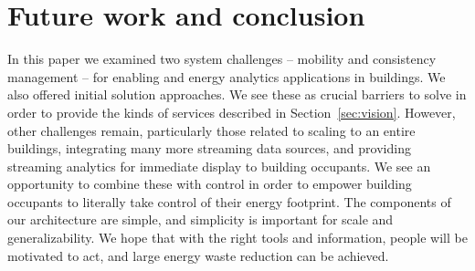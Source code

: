 \section{Future work and conclusion}
In this paper we examined two system challenges -- mobility and consistency management -- for enabling and energy 
analytics applications in buildings.  We also 
offered initial solution approaches.  We
see these as crucial barriers to solve in order to provide the kinds of services described in Section~\ref{sec:vision}.
However, other challenges remain, particularly those related to scaling to an entire buildings, integrating
many more streaming data sources, and providing streaming analytics for immediate display to building occupants.
We see an opportunity to combine these with control in order to empower building occupants to literally take
control of their energy footprint.  The components of our architecture are simple, and simplicity is important for scale and
generalizability.  We hope that with the right tools and information, people will be motivated to act, and large
energy waste reduction can be achieved.